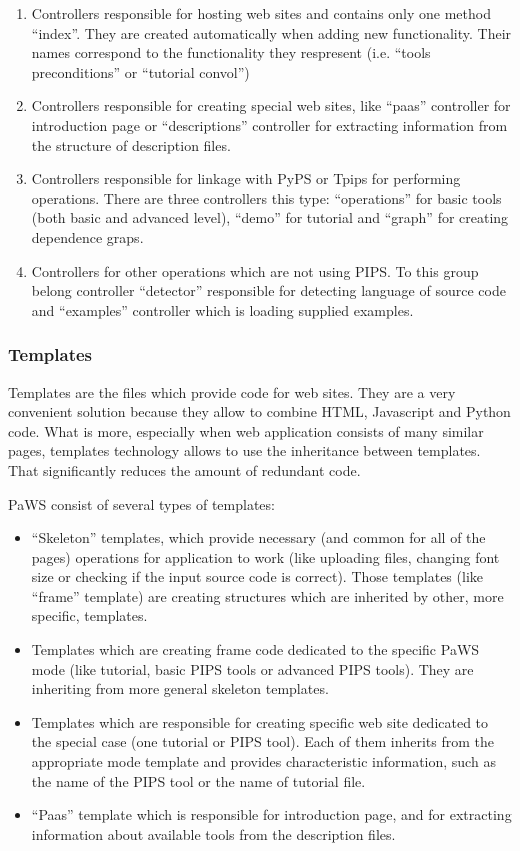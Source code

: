 \begin{enumerate}
  \item Controllers responsible for hosting web sites and contains only one method ``index''. They are created automatically when adding new functionality. Their names correspond to the functionality they respresent (i.e. ``tools preconditions'' or ``tutorial convol'')
  \item Controllers responsible for creating special web sites, like ``paas'' controller for introduction page or ``descriptions'' controller for extracting information from the structure of description files.
  \item Controllers responsible for linkage with PyPS or Tpips for performing operations. There are three controllers this type: ``operations'' for basic tools (both basic and advanced level), ``demo'' for tutorial and ``graph'' for creating dependence graps.
  \item Controllers for other operations which are not using PIPS. To this group belong controller ``detector'' responsible for detecting language of source code and ``examples'' controller which is loading supplied examples.
\end{enumerate}

\subsubsection{Templates}

Templates are the files which provide code for web sites. They are a very convenient solution because they allow to combine HTML, Javascript and Python code. What is more, especially when web application consists of many similar pages, templates technology allows to use the inheritance between templates. That significantly reduces the amount of redundant code. 

PaWS consist of several types of templates:

\begin{itemize}
  \item ``Skeleton'' templates, which provide necessary (and common for all of the pages) operations for application to work (like uploading files, changing font size or checking if the input source code is correct). Those templates (like ``frame'' template) are creating structures which are inherited by other, more specific, templates.
  \item Templates which are creating frame code dedicated to the specific PaWS mode (like tutorial, basic PIPS tools or advanced PIPS tools). They are inheriting from more general skeleton templates. 
  \item Templates which are responsible for creating specific web site dedicated to the special case (one tutorial or PIPS tool). Each of them inherits from the appropriate mode template and provides characteristic information, such as the name of the PIPS tool or the name of tutorial file.
  \item ``Paas'' template which is responsible for introduction page, and for extracting information about available tools from the description files.
\end{itemize}

